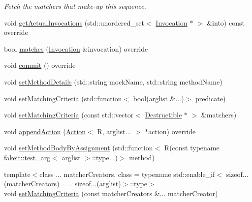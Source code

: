 \begin{DoxyCompactItemize}
\begin{DoxyCompactList}\small\item\em Fetch the matchers that make-\/up this sequence. \end{DoxyCompactList}\item 
void \mbox{\hyperlink{classfakeit_1_1MethodMockingContext_ad6803405abfd419799882f837d6f56b6}{get\+Actual\+Invocations}} (std\+::unordered\+\_\+set$<$ \mbox{\hyperlink{structfakeit_1_1Invocation}{Invocation}} $\ast$ $>$ \&into) const override
\item 
bool \mbox{\hyperlink{classfakeit_1_1MethodMockingContext_a240fe9e15cffcebd52f5b0c9ccf87654}{matches}} (\mbox{\hyperlink{structfakeit_1_1Invocation}{Invocation}} \&invocation) override
\item 
void \mbox{\hyperlink{classfakeit_1_1MethodMockingContext_a68a56b3fbd0a2b654a1c72de66e68a71}{commit}} () override
\item 
void \mbox{\hyperlink{classfakeit_1_1MethodMockingContext_a108167e6800e17c71ed5bbed5fcd955a}{set\+Method\+Details}} (std\+::string mock\+Name, std\+::string method\+Name)
\item 
void \mbox{\hyperlink{classfakeit_1_1MethodMockingContext_a43555a14b32453588eb3990a7c6b9a09}{set\+Matching\+Criteria}} (std\+::function$<$ bool(arglist \&...)$>$ predicate)
\item 
void \mbox{\hyperlink{classfakeit_1_1MethodMockingContext_affc5ac50fc419a5f8b5adff8d5d02941}{set\+Matching\+Criteria}} (const std\+::vector$<$ \mbox{\hyperlink{classfakeit_1_1Destructible}{Destructible}} $\ast$ $>$ \&matchers)
\item 
void \mbox{\hyperlink{classfakeit_1_1MethodMockingContext_ad413d04564c89fe134dfb7bae1a1f2a1}{append\+Action}} (\mbox{\hyperlink{structfakeit_1_1Action}{Action}}$<$ R, arglist... $>$ $\ast$action) override
\item 
void \mbox{\hyperlink{classfakeit_1_1MethodMockingContext_ade0a1e36946f68957ee3717147122c4d}{set\+Method\+Body\+By\+Assignment}} (std\+::function$<$ R(const typename \mbox{\hyperlink{structfakeit_1_1test__arg}{fakeit\+::test\+\_\+arg}}$<$ arglist $>$\+::type...)$>$ method)
\item 
{\footnotesize template$<$class ... matcher\+Creators, class  = typename std\+::enable\+\_\+if$<$                sizeof...(matcher\+Creators) == sizeof...(arglist)$>$\+::type$>$ }\\void \mbox{\hyperlink{classfakeit_1_1MethodMockingContext_ab6bf85e9f9f5e5eeb2766ec487a42e20}{set\+Matching\+Criteria}} (const matcher\+Creators \&... matcher\+Creator)

\end{DoxyCompactItemize}
